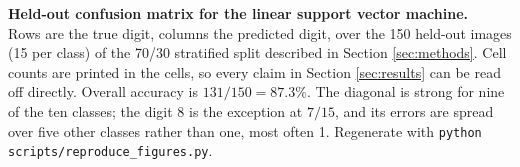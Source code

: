 \caption{\textbf{Held-out confusion matrix for the linear support vector machine.}\\
\smallskip
Rows are the true digit, columns the predicted digit, over the 150 held-out
images (15 per class) of the 70/30 stratified split described in Section
\ref{sec:methods}. Cell counts are printed in the cells, so every claim in
Section \ref{sec:results} can be read off directly. Overall accuracy is
$131/150 = 87.3\%$. The diagonal is strong for nine of the ten classes; the
digit 8 is the exception at $7/15$, and its errors are spread over five other
classes rather than one, most often 1. Regenerate with
\texttt{python scripts/reproduce\_figures.py}.
}
\label{fig:02_confusion_matrix}
